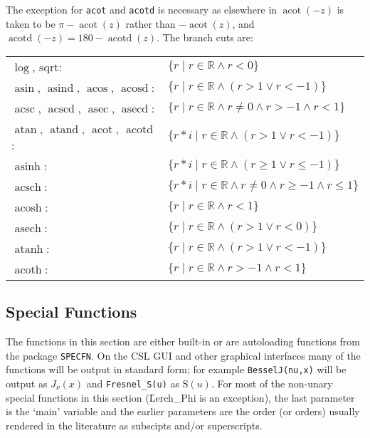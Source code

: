 The exception for \texttt{acot} and \texttt{acotd} is necessary as elsewhere in {\REDUCE}
$\mathop{\mathrm{acot}}(-z)$ is taken to be $\pi - \mathop{\mathrm{acot}}(z)$
rather than $-\mathop{\mathrm{acot}}(z)$, and
$\mathop{\mathrm{acotd}}(-z) = 180 - \mathop{\mathrm{acotd}}(z)$.
The branch cuts are:\\
\begin{tabular}{ll}
  $\log$, $\mathrm{sqrt}$:     & $ \{r   \mid r \in\mathbb{R} \land r < 0\} $\\
  $\mathop{\mathrm{asin}}$, $\mathop{\mathrm{asind}}$, $\mathop{\mathrm{acos}}$, $\mathop{\mathrm{acosd}}$:
                               & $ \{r   \mid r \in\mathbb{R} \land (r > 1 \lor r < -1)\} $\\
  $\mathop{\mathrm{acsc}}$, $\mathop{\mathrm{acscd}}$, $\mathop{\mathrm{asec}}$, $\mathop{\mathrm{asecd}}$:
                               & $ \{r   \mid r \in\mathbb{R} \land r \neq 0 \land r > -1 \land r < 1\} $\\
  $\mathop{\mathrm{atan}}$, $\mathop{\mathrm{atand}}$, $\mathop{\mathrm{acot}}$, $\mathop{\mathrm{acotd}}$:
                               & $ \{r*i \mid r \in\mathbb{R} \land (r > 1 \lor r < -1)\} $\\
  $\mathop{\mathrm{asinh}}$:         & $ \{r*i \mid r \in\mathbb{R} \land (r \geq  1 \lor r \leq  -1)\} $\\
  $\mathop{\mathrm{acsch}}$:         & $ \{r*i \mid r \in\mathbb{R} \land r \neq 0 \land r \geq  -1 \land r \leq  1\} $\\
  $\mathop{\mathrm{acosh}}$:         & $ \{r   \mid r \in\mathbb{R} \land r < 1\} $\\
  $\mathop{\mathrm{asech}}$:         & $ \{r   \mid r \in\mathbb{R} \land (r > 1 \lor r < 0)\} $\\
  $\mathop{\mathrm{atanh}}$:         & $ \{r   \mid r \in\mathbb{R} \land (r > 1 \lor r < -1)\} $\\
  $\mathop{\mathrm{acoth}}$:         & $ \{r   \mid r \in\mathbb{R} \land r > -1 \land r < 1\} $
\end{tabular}

\subsection{Special Functions}
The functions in this section are either built-in or are autoloading
functions from the package \texttt{SPECFN}. On the CSL GUI and other graphical
interfaces many of the functions will be output in standard form; for example
\texttt{BesselJ(nu,x)} will be output as $J_\nu(x)$ and \texttt{Fresnel\_S(u)}
as $\mathrm{S}(u)$. For most of the non-unary special functions in this
section (\f{Lerch\_Phi} is an exception), the last parameter is the `main'
variable and the earlier parameters are the order (or orders)
usually rendered in the literature as subscipts and/or superscripts.

